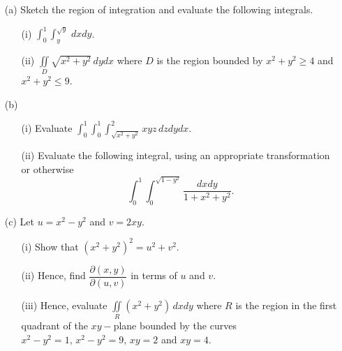 \documentclass[12pt]{uz-exame}
\begin{document}
\begin{question}
\begin{itemize}
\item[(a)] Sketch the region of integration and evaluate the following integrals.
\begin{itemize}
\item[(i)] $\displaystyle \int _0^1 \int _{y}^{\sqrt{y}} \, dxdy$.
\item[(ii)] $\displaystyle \iint \limits _D \sqrt{x^2+y^2}\, dydx$ where $D$ is the region bounded by $x^2+y^2\geq 4$ and\\ $x^2+y^2\leq 9$. 
\end{itemize}
\item[(b)] \begin{itemize}
\item[(i)] Evaluate $\displaystyle \int _0^1\int _0^1 \int _{\sqrt{x^2+y^2}}^2 xyz\, dzdydx.$ 
\item[(ii)] Evaluate the following integral, using an appropriate transformation or otherwise \[\int _0^1 \int _0^{\sqrt{1-y^2}} \dfrac{dxdy}{1+x^2+y^2}.\] 
\end{itemize}
\item[(c)] Let $u=x^2-y^2$ and $v=2xy$.
\begin{itemize}
\item[(i)] Show that $(x^2+y^2)^2=u^2+v^2$. 
\item[(ii)] Hence, find $\dfrac{\partial (x,y)}{\partial (u,v)}$ in terms of $u$ and $v$. 
\item[(iii)] Hence, evaluate $\displaystyle \iint \limits _R (x^2+y^2)\, dxdy$ where $R$ is the region in the first quadrant of the $xy-$plane bounded by the curves $x^2-y^2=1, \, x^2-y^2=9, \, xy=2$ and $xy=4$. 
\end{itemize}
\end{itemize}
\end{question}
\end{document}
